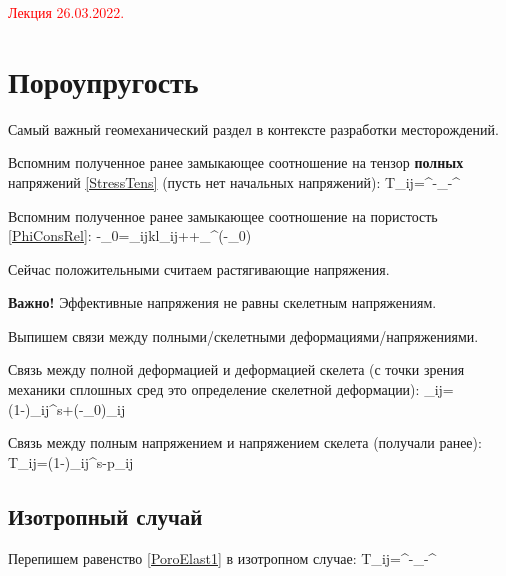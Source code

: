 \documentclass[main.tex]{subfiles}
\begin{document}
\textcolor{red}{Лекция 26.03.2022.}

\section{Пороупругость}

Самый важный геомеханический раздел в контексте разработки месторождений.

Вспомним полученное ранее замыкающее соотношение на тензор \textbf{полных} напряжений \eqref{StressTens} (пусть нет начальных напряжений): 
\beq\label{PoroElast1}
T_{ij}=^{}-_{}-^{}
\eeq

Вспомним полученное ранее замыкающее соотношение на пористость \eqref{PhiConsRel}:
\beq\label{PoroElast2}
\varphi-\varphi_0=\alpha_{ijkl}\varepsilon_{ij}++\alpha_\theta^\varphi\left(\theta-\theta_0\right)
\eeq

Сейчас положительными считаем растягивающие напряжения.

\textbf{Важно!} Эффективные напряжения не равны скелетным напряжениям.

Выпишем связи между полными/скелетными деформациями/напряжениями.

Связь между полной деформацией и деформацией скелета (с точки зрения механики сплошных сред это определение скелетной деформации):
\beq\label{PoroElastRelationship1}
\varepsilon_{ij}=\left(1-\varphi\right)\varepsilon_{ij}^s+\left(\varphi-\varphi_0\right)\delta_{ij}
\eeq

Связь между полным напряжением и напряжением скелета (получали ранее):
\beq\label{PoroElastRelationship2}
T_{ij}=\left(1-\varphi\right)\sigma_{ij}^s-\varphi p\delta_{ij}
\eeq


\subsection{Изотропный случай}
Перепишем равенство \eqref{PoroElast1} в изотропном случае:
\beq\label{IsotropicPoroElast1}
T_{ij}=^{}-_{}-^{}
\eeq
\end{document}
